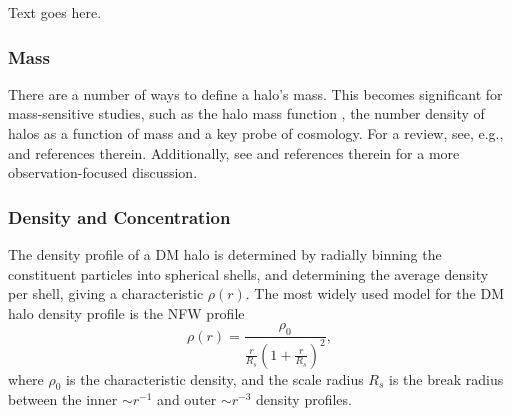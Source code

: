 Text goes here.



\subsubsection{Mass}
\label{subsubsec:early_universe--halo_properties--mass}


There are a number of ways to define a halo's mass.  This becomes significant for mass-sensitive studies, such as the halo mass function \citep{1974ApJ...187..425P, 2007MNRAS.374....2R, 2006ApJ...642L..85H, 2007ApJ...671.1160L}, the number density of halos as a function of mass and a key probe of cosmology.  For a review, see, e.g., \citet{2001A&A...367...27W} and references therein.  Additionally, see \citet{2005RvMP...77..207V} and references therein for a more observation-focused discussion.



\subsubsection{Density and Concentration}
\label{subsubsec:early_universe--halo_properties--density}


The density profile of a DM halo is determined by radially binning the constituent particles into spherical shells, and determining the average density per shell, giving a characteristic $\rho(r)$.  The most widely used model for the DM halo density profile is the NFW \citep{1996ApJ...462..563N} profile
\begin{equation} \label{eq:nfw_profile}
	\rho(r) = \frac{ \rho_{0} }{ \frac{ r }{ R_{s}} \left( 1 + \frac{r}{R_{s}} \right)^{2} },
\end{equation}
where $\rho_{0}$ is the characteristic density, and the scale radius $R_{s}$ is the break radius between the inner $\sim r^{-1}$ and outer $\sim r^{-3}$ density profiles.

